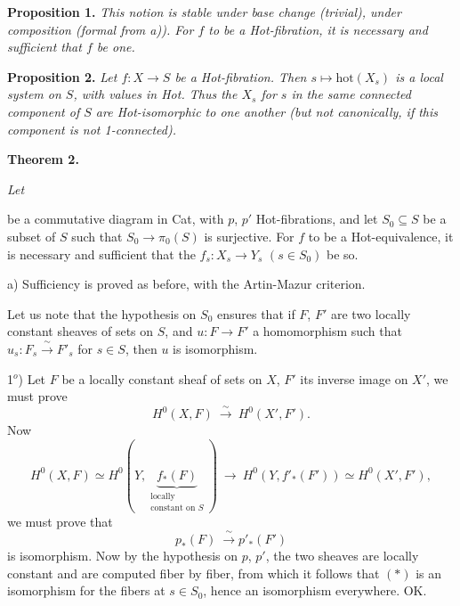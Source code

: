 \documentclass[11pt]{article}
\newcommand{\printedpage}[1]{\marginpar{\footnotesize p.~#1}}
\newcommand{\msp}[1]{\marginpar{\footnotesize [#1]}}
\begin{document}
\printedpage{4}

\textbf{Proposition 1.} \textit{This notion is stable under base change (trivial), under composition (formal from a)). For $f$ to be a \textup{Hot}-fibration, it is necessary and sufficient that $f$ be one.}

\textbf{Proposition 2.} \textit{Let $f : X \longrightarrow S$ be a \textup{Hot}-fibration. Then $s \longmapsto \mathrm{hot}(X_s)$ is a local system on $S$, with values in \textup{Hot}. Thus the $X_s$ for $s$ in the same connected component of $S$ are \textup{Hot}-isomorphic to one another (but not canonically, if this component is not \textup{1}-connected).}

\textbf{Theorem 2.} {\itshape Let
be a commutative diagram in \textup{Cat}, with $p$, $p'$ \textup{Hot}-fibrations, and let $S_0 \subseteq S$ be a subset of $S$ such that $S_0 \longrightarrow \pi_0(S)$ is surjective. For $f$ to be a \textup{Hot}-equivalence, it is necessary and sufficient that the $f_s : X_s \longrightarrow Y_s$ $(s \in S_0)$ be so.} %

a) Sufficiency is proved as before, with the Artin-Mazur criterion.

\msp{page 132}

Let us note that the hypothesis on $S_0$ ensures that if $F$, $F'$ are two locally constant sheaves of sets on $S$, and $u : F \longrightarrow F'$ a homomorphism such that $u_s : F_s \xrightarrow{\ \sim\ } F'_s$ for $s \in S$, then $u$ is isomorphism. %

1$^{o}$) Let $F$ be a locally constant sheaf of sets on $X$, $F'$ its inverse image on $X'$, we must prove
\[
H^0(X,F) \ \xrightarrow{\ \sim\ }\ H^0(X',F').
\]
Now
\[
H^0(X,F) \simeq H^0(Y, \underbrace{f_*(F)}_{\substack{\text{locally}\\ \text{constant on } S}}) \ \longrightarrow\ H^0(Y, f'_*(F')) \simeq H^0(X',F'),
\] %
we must prove that
\[
p_*(F) \ \xrightarrow{\ \sim\ } p'_*(F') \tag*{$(*)$}
\]
is isomorphism. Now by the hypothesis on $p$, $p'$, the two sheaves are locally constant and are computed fiber by fiber, from which it follows that $(*)$ is an isomorphism for the fibers at $s \in S_0$, hence an isomorphism everywhere. OK.
\end{document}
